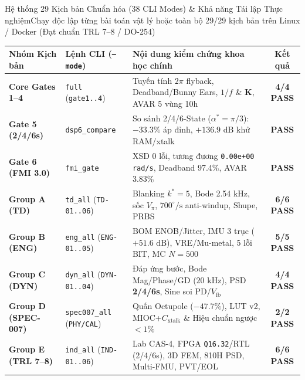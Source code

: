 \documentclass[aspectratio=169,8pt]{beamer}
\begin{document}
\begin{frame}{Hệ thống 29 Kịch bản Chuẩn hóa (38 CLI Modes) \& Khả năng Tái lập Thực nghiệm}{Chạy độc lập từng bài toán vật lý hoặc toàn bộ 29/29 kịch bản trên Linux / Docker (Đạt chuẩn TRL 7--8 / DO-254)}
\scriptsize
\renewcommand{\arraystretch}{1.04}
\begin{tabularx}{\textwidth}{@{}p{2.35cm} p{2.75cm} >{\raggedright\arraybackslash}X c@{}}
\toprule
\textbf{Nhóm Kịch bản} & \textbf{Lệnh CLI (\texttt{--mode})} & \textbf{Nội dung kiểm chứng khoa học chính} & \textbf{Kết quả} \\
\midrule
\textbf{Core Gates 1--4} & \texttt{full} (\texttt{gate1..4}) & Tuyến tính $2\pi$ flyback, Deadband/Bunny Ears, $1/f$ \& $\mathbf{K}$, AVAR 5 vùng 10h & \textcolor{AcadTeal}{\textbf{4/4 PASS}} \\
\textbf{Gate 5 (2/4/6s)} & \texttt{dsp6\_compare} & So sánh 2/4/6-State ($\alpha^*=\pi/3$): $-33.3\%$ áp đỉnh, $+136.9\text{ dB}$ khử RAM/xtalk & \textcolor{AcadTeal}{\textbf{PASS}} \\
\textbf{Gate 6 (FMI 3.0)} & \texttt{fmi\_gate} & XSD 0 lỗi, tương đương \texttt{0.00e+00 rad/s}, Deadband 97.4\%, AVAR 3.83\% & \textcolor{AcadTeal}{\textbf{PASS}} \\
\textbf{Group A (TD)} & \texttt{td\_all} (\texttt{TD-01..06}) & Blanking $k^*=5$, Bode 2.54 kHz, sốc $V_\pi$, $700^\circ/\text{s}$ anti-windup, Shupe, PRBS & \textcolor{AcadTeal}{\textbf{6/6 PASS}} \\
\textbf{Group B (ENG)} & \texttt{eng\_all} (\texttt{ENG-01..05}) & BOM ENOB/Jitter, IMU 3 trục ($+51.6\text{ dB}$), VRE/Mu-metal, 5 lỗi BIT, MC $N=500$ & \textcolor{AcadTeal}{\textbf{5/5 PASS}} \\
\textbf{Group C (DYN)} & \texttt{dyn\_all} (\texttt{DYN-01..04}) & Đáp ứng bước, Bode Mag/Phase/GD ($20\text{ kHz}$), PSD \textbf{2/4/6s}, Sine soi PD/$V_{\text{fb}}$ & \textcolor{AcadTeal}{\textbf{4/4 PASS}} \\
\textbf{Group D (SPEC-007)} & \texttt{spec007\_all} (\texttt{PHY/CAL}) & Quấn Octupole ($-47.7\%$), LUT v2, MIOC+$C_{\text{xtalk}}$ \& Hiệu chuẩn ngược $<1\%$ & \textcolor{AcadTeal}{\textbf{2/2 PASS}} \\
\textbf{Group E (TRL 7--8)} & \texttt{ind\_all} (\texttt{IND-01..06}) & Lab CAS-4, FPGA \texttt{Q16.32}/RTL (2/4/6s), 3D FEM, 810H PSD, Multi-FMU, PVT/EOL & \textcolor{AcadTeal}{\textbf{6/6 PASS}} \\
\bottomrule
\end{tabularx}


\end{frame}
\end{document}
